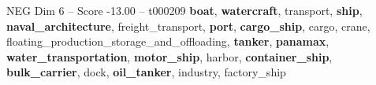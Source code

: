 \begin{textsample}{NEG Dim 6 – Score -13.00 – t000209}  \label{ex:f6_neg_003}
\textbf{boat}, \textbf{watercraft}, transport, \textbf{ship}, \textbf{naval\_architecture}, freight\_transport, \textbf{port}, \textbf{cargo\_ship}, cargo, crane, floating\_production\_storage\_and\_offloading, \textbf{tanker}, \textbf{panamax}, \textbf{water\_transportation}, \textbf{motor\_ship}, harbor, \textbf{container\_ship}, \textbf{bulk\_carrier}, dock, \textbf{oil\_tanker}, industry, factory\_ship

\end{textsample}

